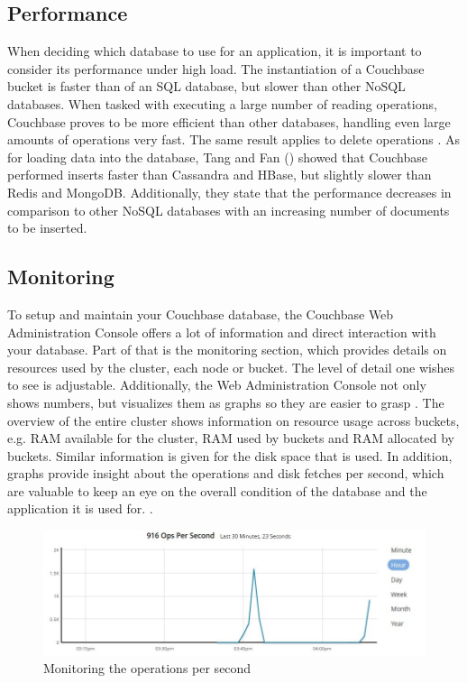 \subsection{Performance}
When deciding which database to use for an application, it is important to consider its performance under high load. The instantiation of a Couchbase bucket is faster than of an SQL database, but slower than other NoSQL databases. When tasked with executing a large number of reading operations, Couchbase proves to be more efficient than other databases, handling even large amounts of operations very fast. The same result applies to delete operations \parencite{compNoSQLandSQL}.  As for loading data into the database, Tang and Fan (\parencite{insert}) showed that Couchbase performed inserts faster than Cassandra and HBase, but slightly slower than Redis and MongoDB. Additionally, they state that the performance decreases in comparison to other NoSQL databases with an increasing number of documents to be inserted.


\subsection{Monitoring}
To setup and maintain your Couchbase database, the Couchbase Web Administration Console offers a lot of information and direct interaction with your database. Part of that is the monitoring section, which provides details on resources used by the cluster, each node or bucket. The level of detail one wishes to see is adjustable. Additionally, the Web Administration Console not only shows numbers, but visualizes them as graphs so they are easier to grasp \parencite{getStarted}. The overview of the entire cluster shows information on resource usage across buckets, e.g. RAM available for the cluster, RAM used by buckets and RAM allocated by buckets. Similar information is given for the disk space that is used. In addition, graphs provide insight about the operations and disk fetches per second, which are valuable to keep an eye on the overall condition of the database and the application it is used for. \parencite{proCouchbaseServer}.

\begin{figure}
    \centering
    \includegraphics[width=\textwidth]{img/couchbaseMonitorOps.jpg}
    \caption{Monitoring the operations per second}
    \label{figure:ops}
\end{figure}

